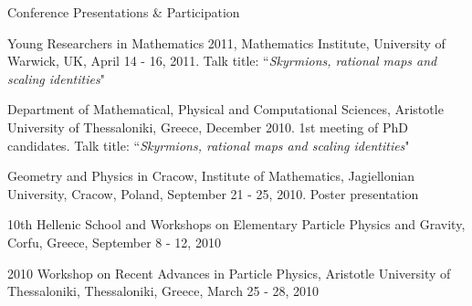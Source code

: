 \documentclass[10pt]{article} %
\begin{document}
\begin{section}{Conference Presentations \& Participation}
\begin{etaremune}
\item  Young Researchers in Mathematics 2011, Mathematics Institute, University of Warwick, UK, April 14 - 16, 2011.
       Talk title: ``\textit{Skyrmions, rational maps and scaling identities}"

\item  Department of Mathematical, Physical and Computational Sciences, Aristotle University of Thessaloniki, Greece, December 2010.
       1st meeting of PhD candidates. Talk title: ``\textit{Skyrmions, rational maps and scaling identities}"

\item  Geometry and Physics in Cracow, Institute of Mathematics, Jagiellonian University, Cracow, Poland,
       September 21 - 25, 2010. Poster presentation

\item   10th Hellenic  School and Workshops on Elementary Particle Physics and Gravity, Corfu, Greece, September 8 - 12, 2010

\item   2010 Workshop on Recent Advances in Particle Physics, Aristotle University of Thessaloniki, Thessaloniki,
        Greece, March 25 - 28, 2010

\end{etaremune}

\end{section}
\end{document}

